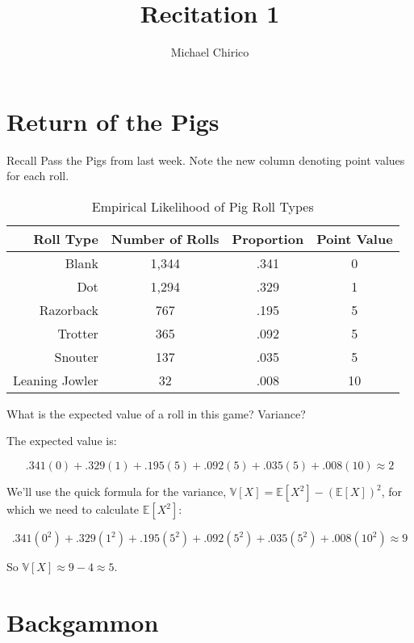 \documentclass{article}
\newenvironment{solution}{\color{red}}{\color{black}}
\begin{document}
\title{Recitation 1}
\author{Michael Chirico}

\maketitle

\section{Return of the Pigs}

Recall Pass the Pigs from last week. Note the new column denoting point values for each roll.

\begin{table}[htbp]
\centering
\begin{tabular}{|r|c|c|c|}
\hline
Roll Type & Number of Rolls & Proportion & Point Value \\
\hline
Blank & 1,344 & .341 & 0 \\
\hline
Dot & 1,294 & .329 & 1 \\
\hline
Razorback & 767 & .195 & 5 \\
\hline
Trotter & 365 & .092 & 5 \\
\hline
Snouter & 137 & .035 & 5 \\
\hline
Leaning Jowler & 32 & .008 & 10 \\
\hline
\end{tabular}
\caption{Empirical Likelihood of Pig Roll Types}
\label{tbl:pigout}
\end{table}

What is the expected value of a roll in this game? Variance?

\begin{solution}
The expected value is:

\[ .341(0) + .329(1) + .195(5) + .092(5) + .035(5) + .008(10) \approx  2\]

We'll use the quick formula for the variance, $\mathbb{V}[X] = \mathbb{E}[X^2] - \left( \mathbb{E}[X] \right)^2$, for which we need to calculate $\mathbb{E}[X^2]$:

\[ .341(0^2) + .329(1^2) + .195(5^2) + .092(5^2) + .035(5^2) + .008(10^2) \approx 9 \]

So $\mathbb{V}[X] \approx 9 - 4 \approx 5$.
\end{solution}

\section{Backgammon}
\end{document}
